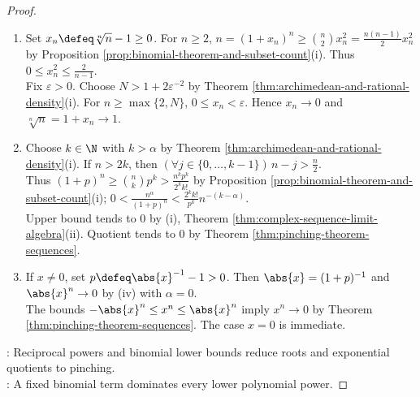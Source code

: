 \begin{theorem}
\begin{proof}
\begin{enumerate}[label=(\roman*)]
\item Set $x_n\defeq\sqrt[n]{n}-1\geq0$. For $n\geq2$, $n=(1+x_n)^n\geq\binom{n}{2}x_n^2=\frac{n(n-1)}{2}x_n^2$ by Proposition \ref{prop:binomial-theorem-and-subset-count}(i). Thus $0\leq x_n^2\leq\frac{2}{n-1}$.\\
Fix $\varepsilon>0$. Choose $N>1+2\varepsilon^{-2}$ by Theorem \ref{thm:archimedean-and-rational-density}(i). For $n\geq\max\{2,N\}$, $0\leq x_n<\varepsilon$. Hence $x_n\to0$ and $\sqrt[n]{n}=1+x_n\to1$.
\item Choose $k\in\N$ with $k>\alpha$ by Theorem \ref{thm:archimedean-and-rational-density}(i). If $n>2k$, then $(\forall j\in\{0,\ldots,k-1\})\,n-j>\frac{n}{2}$.\\
Thus  $(1+p)^n\geq\binom{n}{k}p^k>\frac{n^kp^k}{2^kk!}$ by Proposition \ref{prop:binomial-theorem-and-subset-count}(i); $0<\frac{n^\alpha}{(1+p)^n}<\frac{2^kk!}{p^k}n^{-(k-\alpha)}$.\\
Upper bound tends to $0$ by (i), Theorem \ref{thm:complex-sequence-limit-algebra}(ii). Quotient tends to $0$ by Theorem \ref{thm:pinching-theorem-sequences}.
\item If $x\neq0$, set $p\defeq\abs{x}^{-1}-1>0$. Then $\abs{x}=(1+p)^{-1}$ and $\abs{x}^n\to0$ by (iv) with $\alpha=0$.\\
The bounds $-\abs{x}^n\leq x^n\leq\abs{x}^n$ imply $x^n\to0$ by Theorem \ref{thm:pinching-theorem-sequences}. The case $x=0$ is immediate.
\end{enumerate}
: Reciprocal powers and binomial lower bounds reduce roots and exponential quotients to pinching.\\
: A fixed binomial term dominates every lower polynomial power.
\end{proof}
\end{theorem}

